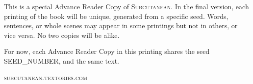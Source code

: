 \thispagestyle{empty}

\vspace*{10\nbs}

\begin{adjustwidth}{4em}{4em}
\begin{parascale}[0.88]




This is a special Advance Reader Copy of \textsc{Subcutanean}. In the final version, each printing of the book will be unique, generated from a specific seed. Words, sentences, or whole scenes may appear in some printings but not in others, or vice versa. No two copies will be alike.

For now, each Advance Reader Copy in this printing shares the seed SEED_NUMBER, and the same text.


\end{parascale}
\end{adjustwidth}

\vspace*{2\nbs}

\begin{center}
\textsc{subcutanean.textories.com}
\end{center}

\clearpage


